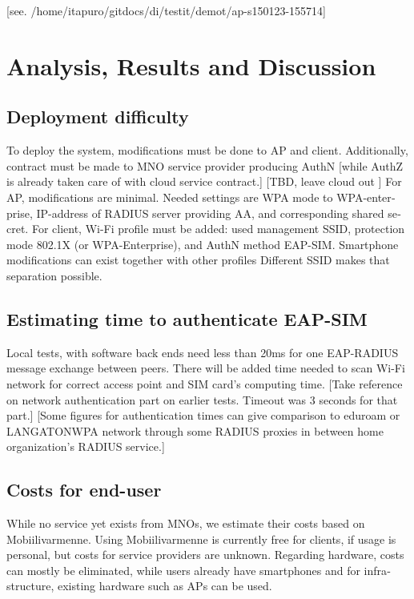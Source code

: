 \documentclass[12pt,a4paper,english]{tutthesis}
\begin{document}
\begin{otherlanguage}{english}
[see. /home/itapuro/gitdocs/di/testit/demot/ap-s150123-155714]


\chapter{Analysis, Results and Discussion}
\label{sec-6}



\section{Deployment difficulty}
\label{sec-6-1}

To deploy the system, modifications must be done to AP and client.
Additionally, contract must be made to MNO service
provider producing AuthN [while AuthZ is already taken care of with
cloud service contract.]  [TBD, leave cloud out ]
For AP, modifications are minimal. Needed settings are
WPA mode to WPA-enterprise, IP-address of RADIUS server providing 
AA, and corresponding shared secret.
For client, Wi-Fi profile must be added: used management SSID,
protection mode 802.1X (or WPA-Enterprise), and AuthN method EAP-SIM.
Smartphone modifications can exist together with other
profiles  Different SSID makes that separation possible.

\section{Estimating time to authenticate EAP-SIM}
\label{sec-6-2}
Local tests, with software back ends need less than 20ms for one EAP-RADIUS message
exchange between peers. There will be added time needed to scan Wi-Fi
network for correct access point and SIM card's computing
time.
 [Take reference on network authentication part on earlier
tests. Timeout was 3 seconds for that part.]
[Some figures for authentication times can give comparison to eduroam
or LANGATONWPA network through some RADIUS proxies in between home
organization's RADIUS service.]

\section{Costs for end-user}
\label{sec-6-3}
While no service yet exists from MNOs, we estimate their costs based on
Mobiilivarmenne. Using Mobiilivarmenne 
is currently free for clients, if usage is personal, but costs
for service providers are unknown. 
Regarding hardware, costs can mostly be eliminated, while users
already have smartphones and for infrastructure, existing hardware
such as APs can be used.


\end{otherlanguage}
\end{document}
